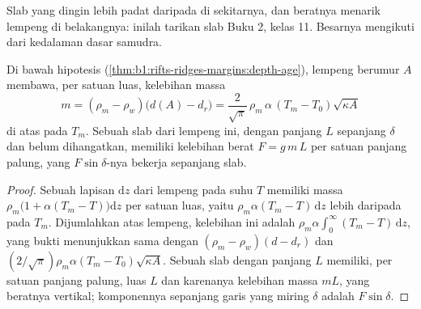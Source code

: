 Slab yang dingin lebih padat daripada  di sekitarnya, dan beratnya menarik lempeng di belakangnya: inilah tarikan slab Buku 2, kelas 11. Besarnya mengikuti dari kedalaman dasar samudra.

\begin{proposition}\label{prop:b1:active-margins:slab-weight}
Di bawah hipotesis 
(\cref{thm:b1:rifts-ridges-margins:depth-age}), lempeng berumur $A$ membawa, per
satuan luas, kelebihan massa
\[
  m = (\rho_m - \rho_w)\bigl(d(A) - d_r\bigr)
    = \frac{2}{\sqrt\pi}\,\rho_m\,\alpha\,(T_m - T_0)\sqrt{\kappa A}
\]
di atas  pada $T_m$. Sebuah slab dari lempeng ini, dengan panjang $L$ sepanjang 
$\delta$ dan belum dihangatkan, memiliki kelebihan berat $F = g\,m\,L$ per satuan panjang
palung, yang $F\sin\delta$-nya bekerja sepanjang slab.
\end{proposition}

\begin{proof}
Sebuah lapisan $\mathrm dz$ dari lempeng pada suhu $T$ memiliki massa
$\rho_m\bigl(1 + \alpha(T_m - T)\bigr)\mathrm dz$ per satuan luas, yaitu
$\rho_m\alpha(T_m - T)\,\mathrm dz$ lebih daripada  pada $T_m$. Dijumlahkan atas
lempeng, kelebihan ini adalah $\rho_m\alpha\int_0^\infty (T_m - T)\,\mathrm dz$, yang
bukti  menunjukkan sama dengan
$(\rho_m - \rho_w)(d - d_r)$ dan $(2/\sqrt\pi)\rho_m\alpha(T_m - T_0)
\sqrt{\kappa A}$. Sebuah slab dengan panjang $L$ memiliki, per satuan panjang palung, luas
$L$ dan karenanya kelebihan massa $mL$, yang beratnya vertikal; komponennya sepanjang
garis yang miring $\delta$ adalah $F\sin\delta$.
\end{proof}

